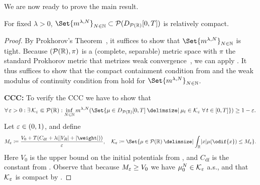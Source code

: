 We are now ready to prove the main result.

\begin{theorem}
  For fixed \(\lambda > 0\), \(\Set{ \lawmu^{\lambda, N} }_{N\in\bN} \subset \cP(D_{\cP(\potspace)}[0,T])\) is relatively compact.
\end{theorem}

\begin{proof}
  By Prokhorov's Theorem~\cite[Theorem 5.1]{billingsleyConvergenceProbabilityMeasures1999}, it suffices to show that \(\Set{ \lawmu^{\lambda, N} }_{N\in\bN}\) is tight.
  Because \((\mathcal{P}(\mathbb{R}), \pi)\) is a (complete, separable) metric space with \( \pi \) the standard Prokhorov metric that metrizes weak convergence~\cite[Theorem 6.8]{billingsleyConvergenceProbabilityMeasures1999}, we can apply .
  It thus suffices to show that the compact containment condition from  and the weak modulus of continuity condition from  hold for \( \Set{ \lawmu^{\lambda, N} }_{N\in\bN} \).

  \textbf{CCC:}
  To verify the CCC we have to show that
  \begin{equation}
    \forall \eps > 0 : \exists \cK_\eps \Subset \cP(\potspace) :
    \inf_{N\in\bN} \lawmu^{\lambda, N} ( \Set{ \mu \in D_{\cP(\potspace)}[0,T] \given \mu_t \in \cK_\eps\ \forall t \in [0,T] } ) \geq 1 - \eps.
  \end{equation}
  Let \(\varepsilon \in (0,1)\), and define
  \begin{equation}
    M_\eps \coloneqq \frac{V_0 + T ( C_\mathrm{df} + \lambda (\abs{V_R} + \abs{\weight}) )}{\eps},
    \quad
    \cK_\eps \coloneqq \Set{ \mu \in \cP(\potspace) \given \int_\potspace \abs{x} \mu(\odif{x}) \leq M_\eps }.
  \end{equation}
  Here \( V_0 \) is the upper bound on the initial potentials from , and \( C_\mathrm{df} \) is the constant from .
  Observe that because \( M_\varepsilon \geq V_0 \) we have \( \mu_0^N \in \mathcal{K}_\varepsilon \) a.s., and that \( \mathcal{K}_\varepsilon \) is compact by .


\end{proof}
